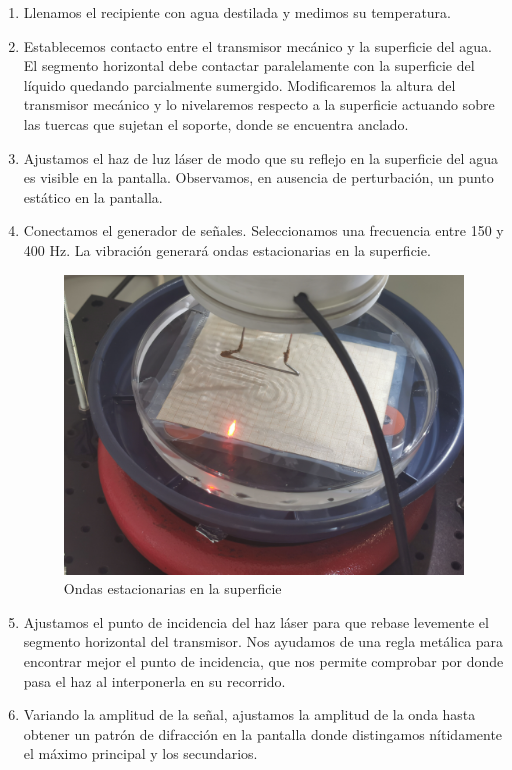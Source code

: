 \documentclass[a4paper,12pt,spanish]{article}
\begin{document}
	\begin{enumerate}
		\item Llenamos el recipiente con agua destilada y medimos su temperatura.
		
		\item Establecemos contacto entre el transmisor mecánico y la superficie del agua. El segmento horizontal debe contactar paralelamente con la	superficie del líquido quedando parcialmente sumergido. Modificaremos la altura del transmisor mecánico y lo nivelaremos respecto a la superficie actuando sobre	las tuercas que sujetan el soporte, donde se encuentra anclado.
		
		\item Ajustamos el haz de luz láser de modo que su reflejo en la superficie del agua es visible en la pantalla. Observamos, en ausencia de perturbación, un punto estático en la pantalla.
		
		\item Conectamos el generador de señales. Seleccionamos una frecuencia entre 150 y 400 Hz. La vibración generará ondas estacionarias en la superficie.
		
		\begin{figure}    %
			\centering
			\includegraphics[width=0.6\linewidth]{../fotos/IMG_20240307_103222}
			\caption{Ondas estacionarias en la superficie}
			\label{fig:img20240307103222}
		\end{figure}
		
		\item Ajustamos el punto de incidencia del haz láser para que rebase levemente el segmento horizontal del transmisor. Nos ayudamos de una regla metálica para encontrar mejor el punto de incidencia, que nos permite comprobar por donde pasa el haz al interponerla en su recorrido. 
		
		\item Variando la amplitud de la señal, ajustamos la amplitud de la onda hasta obtener un patrón de difracción en la pantalla donde distingamos nítidamente el máximo principal y los secundarios. 
		

\end{enumerate}
\end{document}

